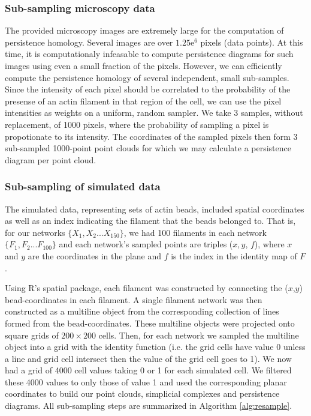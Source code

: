 \documentclass[10pt]{article}
\begin{document}
\subsubsection{Sub-sampling microscopy data}
The provided microscopy images are extremely large for the computation of persistence homology. Several images are over $1.25\mathrm{e}^6$ pixels (data points). At this time, it is computationaly infeasable to compute persistence diagrams for such images using even a small fraction of the pixels. However, we can efficiently compute the persistence homology of several independent, small sub-samples. Since the intensity of each pixel should be correlated to the probability of the presense of an actin filament in that region of the cell, we can use the pixel intensities as weights on a uniform, random sampler. We take 3 samples, without replacement, of 1000 pixels, where the probability of sampling a pixel is propotionate to its intensity. The coordinates of the sampled pixels then form 3 sub-sampled 1000-point point clouds for which we may calculate a persistence diagram per point cloud.

\subsubsection{Sub-sampling of simulated data}
The simulated data, representing sets of actin beads, included spatial coordinates as well as an index indicating the filament that the beads belonged to. That is, for our networks $\{X_1, X_2... X_{150}\}$, we had 100 filaments in each network $\{F_1, F_2... F_{100}\}$ and each network's sampled points are triples ($x, y$, $f$), where  $x$ and $y$ are the coordinates in the plane and $f$ is the index in the identity map of $F$. 

Using R’s spatial package, each filament was constructed by connecting the ($x$,$y$) bead-coordinates in each filament. A single filament network was then constructed as a multiline object from the corresponding collection of lines formed from the bead-coordinates. These multiline objects were projected onto square grids of $200\times200$ cells. Then, for each network we sampled the multiline object into a grid with the identity function (i.e. the grid cells have value 0 unless a line and grid cell intersect then the value of the grid cell goes to 1). We now had a grid of 4000 cell values taking 0 or 1 for each simulated cell. We filtered these 4000 values to only those of value 1 and used the corresponding planar coordinates to build  our point clouds, simplicial complexes and persistence diagrams. All sub-sampling steps are summarized in Algorithm \ref{alg:resample}. 
\end{document}
